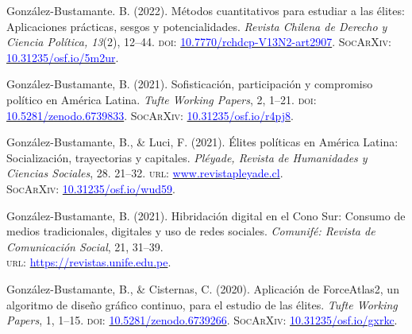 
\begin{publications}

\begin{benumerate}{14}

\item{\small González-Bustamante. B. (2022). Métodos cuantitativos para estudiar a las élites: Aplicaciones prácticas, sesgos y potencialidades. {\itshape Revista Chilena de Derecho y Ciencia Política, 13}(2), 12--44. {\scshape doi:} \href{https://doi.org/10.7770/rchdcp-V13N2-art2907}{\textcolor{blue}{10.7770/rchdcp-V13N2-art2907}}. {\scshape \footnotesize SocArXiv:} \href{https://doi.org/10.31235/osf.io/5m2ur}{\textcolor{blue}{10.31235/osf.io/5m2ur}}.}\vspace{1mm}

\item{\small González-Bustamante, B. (2021). Sofisticación, participación y compromiso político en América Latina. {\itshape Tufte Working Papers}, 2, 1--21. {\scshape doi:} \href{https://doi.org/10.5281/zenodo.6739833}{\textcolor{blue}{10.5281/zenodo.6739833}}. {\scshape \footnotesize SocArXiv:} \href{https://doi.org/10.31235/osf.io/r4pj8}{\textcolor{blue}{10.31235/osf.io/r4pj8}}.}\vspace{1mm}

\item{\small González-Bustamante, B., \& Luci, F. (2021). Élites políticas en América Latina: Socialización, trayectorias y capitales. {\itshape Pléyade, Revista de Humanidades y Ciencias Sociales}, 28. 21--32. {\scshape url:} \href{http://www.revistapleyade.cl/index.php/OJS/article/view/359}{\textcolor{blue}{www.revistapleyade.cl}}. \\ {\scshape \footnotesize SocArXiv:} \href{https://doi.org/10.31235/osf.io/wud59}{\textcolor{blue}{10.31235/osf.io/wud59}}.}\vspace{1mm}

\item{\small González-Bustamante, B. (2021).  Hibridación digital en el Cono Sur: Consumo de medios tradicionales, digitales y uso de redes sociales. {\itshape Comunifé: Revista de Comunicación Social}, 21, 31--39. \\ {\scshape url:} \href{https://revistas.unife.edu.pe/index.php/comunife/article/view/2580/}{\textcolor{blue}{https://revistas.unife.edu.pe}}.}\vspace{1mm}

\item{\small González-Bustamante, B., \& Cisternas, C. (2020). Aplicación de ForceAtlas2, un algoritmo de diseño gráfico continuo, para el estudio de las élites. {\itshape Tufte Working Papers}, 1, 1--15. {\scshape doi:} \href{https://doi.org/10.5281/zenodo.6739266}{\textcolor{blue}{10.5281/zenodo.6739266}}. {\scshape \footnotesize SocArXiv:} \href{https://doi.org/10.31235/osf.io/gxrkc}{\textcolor{blue}{10.31235/osf.io/gxrkc}}.}\vspace{1mm}


\end{benumerate}
\end{publications}
